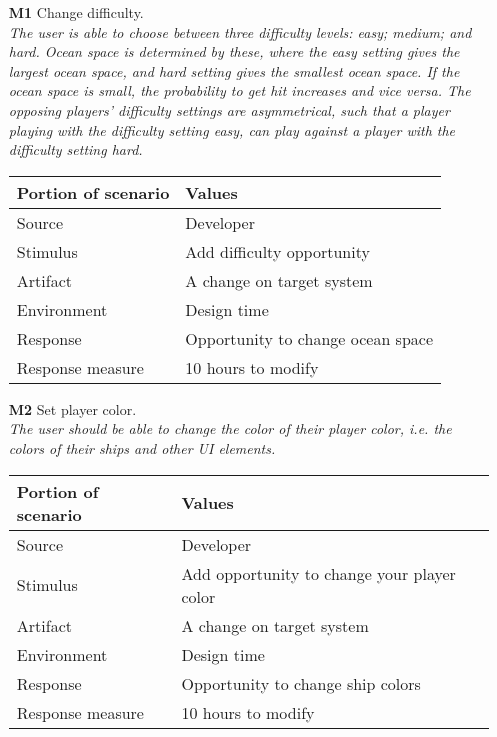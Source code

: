     \begin{itemize}
        \item[\textbf{M1}] Change difficulty. \\
        \textit{\small{The user is able to choose between three difficulty levels: easy; medium; and hard. Ocean space is determined by these, where the easy setting gives the largest ocean space, and hard setting gives the smallest ocean space. If the ocean space is small, the probability to get hit increases and vice versa. The opposing players' difficulty settings are asymmetrical, such that a player playing with the difficulty setting \emph{easy}, can play against a player with the difficulty setting \emph{hard}.}}
        
        \begin{tabular}{| l | l |}
            \hline
            \rowcolor[gray]{0.8}
            \textbf{Portion of scenario} & \textbf{Values} \\
            \hline
            Source &  Developer \\
            Stimulus & Add difficulty opportunity \\
            Artifact & A change on target system \\
            Environment & Design time \\
            Response & Opportunity to change ocean space  \\
            Response measure & 10 hours to modify  \\
            \hline
        \end{tabular}
        
        \item[\textbf{M2}] Set player color. \\
        \textit{\small{The user should be able to change the color of their player color, i.e. the colors of their ships and other UI elements.}}
        
        \begin{tabular}{| l | l |}
            \hline
            \rowcolor[gray]{0.8}
            \textbf{Portion of scenario} & \textbf{Values} \\
            \hline
            Source & Developer \\
            Stimulus & Add opportunity to change your player color \\
            Artifact & A change on target system \\
            Environment & Design time \\
            Response & Opportunity to change ship colors  \\
            Response measure & 10 hours to modify \\
            \hline
        \end{tabular}
    

\end{itemize}
